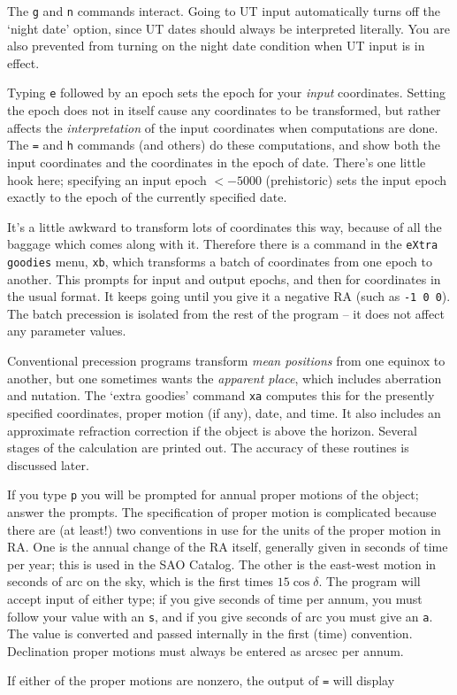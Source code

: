 The {\tt g} and {\tt n} commands interact.  Going to UT input automatically
turns off the `night date' option, since UT dates should always be
interpreted literally.  You are also prevented from turning on the 
night date condition when UT input is in effect.

  
\par
{}

Typing {\tt e} followed by an epoch
sets the epoch for your {\it input} coordinates.  Setting the
epoch does not in itself cause any coordinates to
be transformed, but rather affects the {\it interpretation}
of the input coordinates when computations are done. 
The {\tt =} and {\tt h} commands (and others) do these
computations, and show both the input coordinates
and the coordinates in the epoch of date.  There's one little hook
here; specifying an input epoch $ < -5000$ (prehistoric) sets the input
epoch exactly to the epoch of the currently specified date.

It's a little awkward to transform lots of coordinates this way, 
because of all the baggage which comes along with it.  Therefore
there is a command in the {\tt eXtra goodies} menu, {\tt xb},
which transforms a batch of coordinates from one epoch to another.
This prompts for input and output epochs, and then for coordinates
in the usual format.  It keeps going until you give it a negative
RA (such as {\tt -1 0 0}).  The batch precession is isolated from
the rest of the program -- it does not affect any parameter values. 

Conventional precession programs transform {\it mean positions} from
one equinox to another, but one sometimes wants the {\it apparent place},
which includes aberration and nutation.  The `extra goodies' command
{\tt xa} computes this for the presently specified coordinates,
proper motion (if any), date, and time.  It also includes an
approximate refraction correction if the object is above the horizon. 
Several stages of the calculation are printed out.
The accuracy of these routines is discussed later.

\par
If you type {\tt p} you will be prompted for annual proper motions of
the object; answer the prompts.  The specification of proper motion is 
complicated because
there are (at least!) two conventions in use for the units of the
proper motion in RA.  One is the annual change of the RA itself, generally
given in seconds of time per year; this is used in the SAO Catalog.
The other is the east-west motion in seconds of arc on the sky,
which is the first times $15 \cos \delta$.  The program will accept
input of either type; if you give seconds of time per annum, you
must follow your value with an {\tt s}, and if you give seconds of
arc you must give an {\tt a}.  The value is converted and passed
internally in the first (time) convention.
Declination proper motions must always be entered as
arcsec per annum.
\par
If either of the proper motions are nonzero, the output of {\tt =} will display

